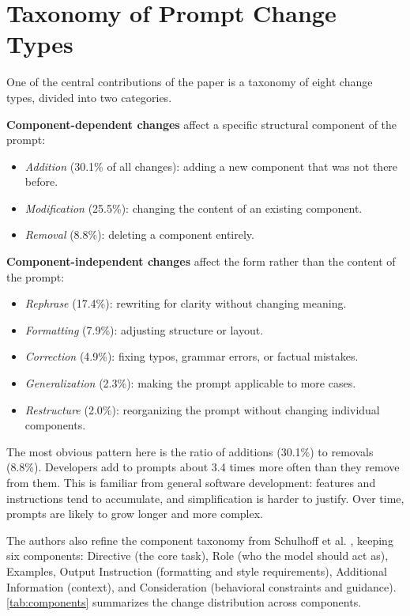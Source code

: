 \documentclass[
    pdftex,
    final,
    11pt,
    a4paper,
    parskip=false,
    oneside,
    footheight=0mm,
    footinclude=false,
    toc=bibliography
]{scrbook}
\begin{document}
\section{Taxonomy of Prompt Change Types}

One of the central contributions of the paper is a taxonomy of eight change types, divided into two categories.

\textbf{Component-dependent changes} affect a specific structural component of the prompt:
\begin{itemize}
    \item \textit{Addition} (30.1\% of all changes): adding a new component that was not there before.
    \item \textit{Modification} (25.5\%): changing the content of an existing component.
    \item \textit{Removal} (8.8\%): deleting a component entirely.
\end{itemize}

\textbf{Component-independent changes} affect the form rather than the content of the prompt:
\begin{itemize}
    \item \textit{Rephrase} (17.4\%): rewriting for clarity without changing meaning.
    \item \textit{Formatting} (7.9\%): adjusting structure or layout.
    \item \textit{Correction} (4.9\%): fixing typos, grammar errors, or factual mistakes.
    \item \textit{Generalization} (2.3\%): making the prompt applicable to more cases.
    \item \textit{Restructure} (2.0\%): reorganizing the prompt without changing individual components.
\end{itemize}

The most obvious pattern here is the ratio of additions (30.1\%) to removals (8.8\%). Developers add to prompts about 3.4 times more often than they remove from them. This is familiar from general software development: features and instructions tend to accumulate, and simplification is harder to justify. Over time, prompts are likely to grow longer and more complex.

The authors also refine the component taxonomy from Schulhoff et al. \cite{Schulhoff2024}, keeping six components: Directive (the core task), Role (who the model should act as), Examples, Output Instruction (formatting and style requirements), Additional Information (context), and Consideration (behavioral constraints and guidance). \autoref{tab:components} summarizes the change distribution across components.
\end{document}
